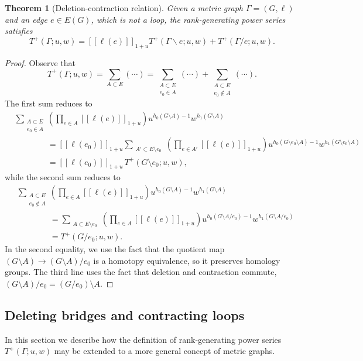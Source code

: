 \documentclass{amsart}
\newtheorem{thm}{Theorem}
\theoremstyle{definition}
\newcommand{\fanalog}[2]{[\![#2]\!]_{#1}}
\begin{document}
\begin{thm}[Deletion-contraction relation]\label{thm:deletion-contraction}
Given a metric graph $\Gamma = (G,\ell)$ and an edge $e \in E(G)$,
which is not a loop,
the rank-generating power series satisfies
\begin{equation}
	T^+(\Gamma; u,w) 
	= \fanalog{1 + u}{\ell(e)} T^+(\Gamma \backslash e; u,w) + T^+(\Gamma / e; u,w) .
\end{equation}
\end{thm}

\begin{proof}
Observe that
\[
	T^+(\Gamma; u,w) 
	= \sum_{A \subset E} (\cdots)
	= \sum_{\substack{A \subset E \\ e_0 \in A}} (\cdots) + \sum_{\substack{A \subset E \\ e_0 \not \in A}} (\cdots).
\]
The first sum reduces to
\begin{align*}
	&\sum_{\substack{A \subset E \\ e_0 \in A}} \left( \prod_{e \in A} \fanalog{1+u}{\ell(e)} \right) u^{h_0(G\setminus A)-1}w^{h_1(G\setminus A)}\\
	&\qquad\qquad = \fanalog{1+u}{\ell(e_0)} \sum_{\substack{A' \subset E \setminus e_0}} \left( \prod_{e \in A'}\fanalog{1+u}{\ell(e)} \right) u^{h_0(G\setminus e_0\setminus A)-1}w^{h_1(G\setminus e_0\setminus A)} \\[1.5em]
	&\qquad\qquad = \fanalog{1+u}{\ell(e_0)}\, T^+(G\setminus e_0;u,w),
\end{align*}
while the second sum reduces to
\begin{align*}
	&\sum_{\substack{A \subset E \\ e_0 \not\in A}} \left( \prod_{e \in A} \fanalog{1+u}{\ell(e)} \right) u^{h_0(G\setminus A)-1}w^{h_1(G\setminus A)}\\
	&\qquad\qquad = \sum_{\substack{A \subset E \setminus e_0}} \left( \prod_{e \in A} \fanalog{1+u}{\ell(e)} \right) u^{h_0(G \setminus A / e_0)-1}w^{h_1(G\setminus A / e_0)} \\[1.5em]
	&\qquad\qquad = T^+(G/ e_0;u,w).
\end{align*}
In the second equality, we use the fact that the quotient map $(G\setminus A) \to (G\setminus A)/e_0$ is a homotopy equivalence, so it preserves homology groups. The third line uses the fact that deletion and contraction commute, $(G \setminus A) / e_0 = (G / e_0) \setminus A$.
\end{proof}


\subsection{Deleting bridges and contracting loops}
In this section we describe how the definition of rank-generating power series $T^+(\Gamma;u,w)$
may be extended to a more general concept of metric graphs.
\end{document}
